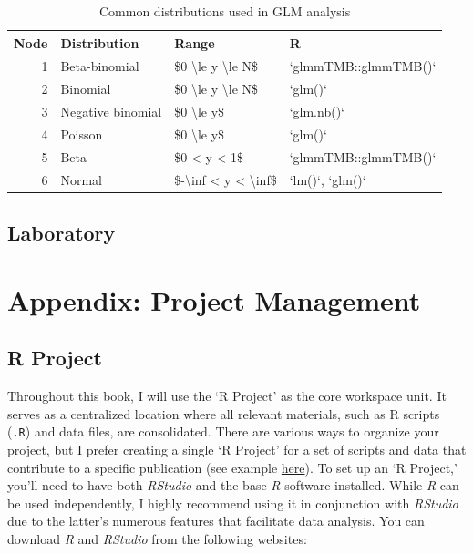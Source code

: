 \documentclass[
]{book}
\begin{document}
\begin{table}

\caption{\label{tab:table-dist}Common distributions used in GLM analysis}
\centering
\begin{tabular}[t]{r|l|l|l}
\hline
Node & Distribution & Range & R\\
\hline
1 & Beta-binomial & \$0 \textbackslash{}le y \textbackslash{}le N\$ & `glmmTMB::glmmTMB()`\\
\hline
2 & Binomial & \$0 \textbackslash{}le y \textbackslash{}le N\$ & `glm()`\\
\hline
3 & Negative binomial & \$0 \textbackslash{}le y\$ & `glm.nb()`\\
\hline
4 & Poisson & \$0 \textbackslash{}le y\$ & `glm()`\\
\hline
5 & Beta & \$0 < y < 1\$ & `glmmTMB::glmmTMB()`\\
\hline
6 & Normal & \$-\textbackslash{}inf < y < \textbackslash{}inf\$ & `lm()`, `glm()`\\
\hline
\end{tabular}
\end{table}

\hypertarget{laboratory-7}{%
\section{Laboratory}\label{laboratory-7}}

\hypertarget{appendix-project-management}{%
\chapter{Appendix: Project Management}\label{appendix-project-management}}

\hypertarget{r-project}{%
\section{R Project}\label{r-project}}

Throughout this book, I will use the `R Project' as the core workspace unit. It serves as a centralized location where all relevant materials, such as R scripts (\texttt{.R}) and data files, are consolidated. There are various ways to organize your project, but I prefer creating a single `R Project' for a set of scripts and data that contribute to a specific publication (see example \href{https://github.com/aterui/public-proj_stream-diversity}{here}). To set up an `R Project,' you'll need to have both \emph{RStudio} and the base \emph{R} software installed. While \emph{R} can be used independently, I highly recommend using it in conjunction with \emph{RStudio} due to the latter's numerous features that facilitate data analysis. You can download \emph{R} and \emph{RStudio} from the following websites:
\end{document}
